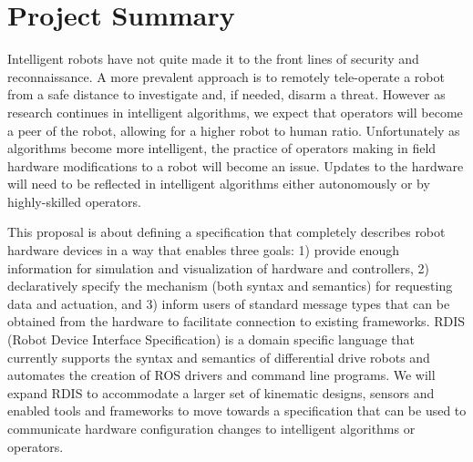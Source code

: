 
\section*{\vspace{-2em}\center Project Summary}

Intelligent robots have not quite made it to the front lines of security and reconnaissance.  A more prevalent approach is to remotely tele-operate a robot from a safe distance to investigate and, if needed, disarm a threat.  However as research continues in intelligent algorithms, we expect that operators will become a peer of the robot, allowing for a higher robot to human ratio.  Unfortunately as algorithms become more intelligent, the practice of operators making in field hardware modifications to a robot will become an issue.  Updates to the hardware will need to be reflected in intelligent algorithms either autonomously or by highly-skilled operators.  

This proposal is about defining a specification that completely describes robot hardware devices in a way that enables three goals: 1) provide enough information for simulation and visualization of hardware and controllers, 2) declaratively specify the mechanism (both syntax and semantics) for requesting data and actuation, and 3) inform users of standard message types that can be obtained from the hardware to facilitate connection to existing frameworks.  RDIS (Robot Device Interface Specification) is a domain specific language that currently supports the syntax and semantics of differential drive robots and automates the creation of ROS drivers and command line programs.  We will expand RDIS to accommodate a larger set of kinematic designs, sensors and enabled tools and frameworks to move towards a specification that can be used to communicate hardware configuration changes to intelligent algorithms or operators. 

%
%  

